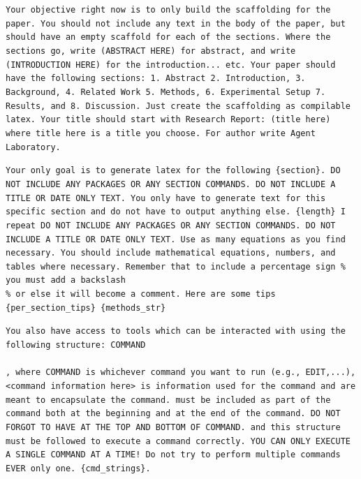 \documentclass[11pt, a4paper]{gdm_format}
\begin{document}
\begin{tcolorbox}[breakable,colback=orange!5!white, colframe=orange!80!black, title=paper-solve System Prompt (Scaffold)]
\texttt{Your objective right now is to only build the scaffolding for the paper. You should not include any text in the body of the paper, but should have an empty scaffold for each of the sections.  Where the sections go, write (ABSTRACT HERE) for abstract, and write (INTRODUCTION HERE) for the introduction... etc. Your paper should have the following sections: 1. Abstract 2. Introduction, 3. Background, 4. Related Work 5. Methods, 6. Experimental Setup 7. Results, and 8. Discussion. Just create the scaffolding as compilable latex. Your title should start with Research Report: (title here) where title here is a title you choose. For author write Agent Laboratory.}
\end{tcolorbox}




\begin{tcolorbox}[breakable,colback=orange!5!white, colframe=orange!80!black, title=paper-solve System Prompt (Method)]
\texttt{Your only goal is to generate latex for the following \{section\}. DO NOT INCLUDE ANY PACKAGES OR ANY SECTION COMMANDS. DO NOT INCLUDE A TITLE OR DATE ONLY TEXT. You only have to generate text for this specific section and do not have to output anything else. \{length\} I repeat DO NOT INCLUDE ANY PACKAGES OR ANY SECTION COMMANDS. DO NOT INCLUDE A TITLE OR DATE ONLY TEXT. Use as many equations as you find necessary. You should include mathematical equations, numbers, and tables where necessary. Remember that to include a percentage sign \% you must add a backslash \\\% or else it will become a comment. Here are some tips \{per\_section\_tips\}  \{methods\_str\}}
\end{tcolorbox}




\begin{tcolorbox}[breakable,colback=orange!5!white, colframe=orange!80!black, title=paper-solve Command Description]
\texttt{You also have access to tools which can be interacted with using the following structure: \textasciigrave\textasciigrave\textasciigrave COMMAND\\<command information here>\\\textasciigrave\textasciigrave\textasciigrave, where COMMAND is whichever command you want to run (e.g., EDIT,...), <command information here> is information used for the command and \textasciigrave\textasciigrave\textasciigrave are meant to encapsulate the command. \textasciigrave\textasciigrave\textasciigrave must be included as part of the command both at the beginning and at the end of the command. DO NOT FORGOT TO HAVE \textasciigrave\textasciigrave\textasciigrave AT THE TOP AND BOTTOM OF COMMAND. and this structure must be followed to execute a command correctly. YOU CAN ONLY EXECUTE A SINGLE COMMAND AT A TIME! Do not try to perform multiple commands EVER only one. \{cmd\_strings\}.}
\end{tcolorbox}
\end{document}
